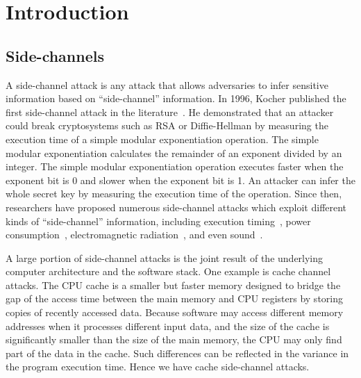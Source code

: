
\chapter{Introduction} \label{chapter1}
\section{Side-channels}
A side-channel attack is any attack that allows adversaries to infer sensitive information based on ``side-channel'' information. In 1996, Kocher published the first side-channel attack in the literature~\cite{kocher1996timing}. He demonstrated that an attacker could break cryptosystems such as RSA or Diffie-Hellman by measuring the execution time of a simple modular exponentiation operation. The simple modular exponentiation calculates the remainder of an exponent divided by an integer.  The simple modular exponentiation operation executes faster when the exponent bit is 0 and slower when the exponent bit is 1. An attacker can infer the whole secret key by measuring the execution time of the operation. Since then, researchers have proposed numerous side-channel attacks which exploit different kinds of ``side-channel'' information, including execution timing~\cite{184415,disselkoen2017prime+}, power consumption~\cite{kar20178}, electromagnetic radiation~\cite{agrawal2002side,217605}, and even sound~\cite{chari1999towards}. 

A large portion of side-channel attacks is the joint result of the underlying computer architecture and the software stack.  One example is cache channel attacks. The CPU cache is a smaller but faster memory designed to bridge the gap of the access time between the main memory and CPU registers by storing copies of recently accessed data. Because software may access different memory addresses when it processes different input data, and the size of the cache is significantly smaller than the size of the main memory, the CPU may only find part of the data in the cache. Such differences can be reflected in the variance in the program execution time. Hence we have cache side-channel attacks.


